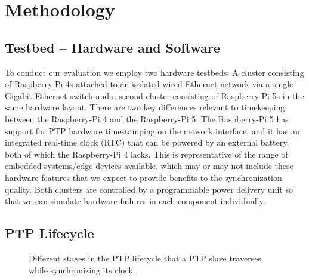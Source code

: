 
\section{Methodology}

\subsection{Testbed -- Hardware and Software}

To conduct our evaluation we employ two hardware testbeds: A cluster consisting of Raspberry Pi 4s attached to an isolated wired Ethernet network via a single Gigabit Ethernet switch and a second cluster consisting of Raspberry Pi 5s in the same hardware layout. There are two key differences relevant to timekeeping between the Raspberry-Pi 4 and the Raspberry-Pi 5: The Raspberry-Pi 5 has support for PTP hardware timestamping on the network interface, and it has an integrated real-time clock (RTC) that can be powered by an external battery, both of which the Raspberry-Pi 4 lacks. This is representative of the range of embedded systems/edge devices available, which may or may not include these hardware features that we expect to provide benefits to the synchronization quality. Both clusters are controlled by a programmable power delivery unit so that we can simulate hardware failures in each component individually.

\subsection{PTP Lifecycle}


\begin{figure*}
    \newcommand{\intervalAnnotation}[4]{
        \draw[Bar-Bar] ([yshift=#3, xshift=-0.1cm]#1.south west) -- ([yshift=#3, xshift=0.1cm]#2.south east) node[midway, below] {#4};
    }
    \newcommand{\intervalAnnotationAbove}[4]{
            \draw[Bar-Bar] ([yshift=#3, xshift=-0.1cm]#1.north west) -- ([yshift=#3, xshift=0.1cm]#2.north east) node[midway, above] {#4};
    }

    \caption{Different stages in the PTP lifecycle that a PTP slave traverses while synchronizing its clock. }
    \label{fig:ptp-lifecycle}
\end{figure*}

